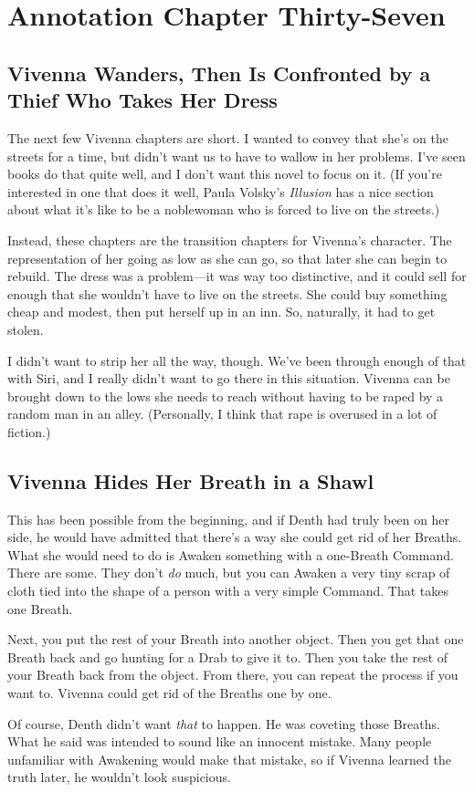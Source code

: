 \section{Annotation Chapter Thirty-Seven}

\subsection*{Vivenna Wanders, Then Is Confronted by a Thief Who Takes Her Dress}

The next few Vivenna chapters are short. I wanted to convey that she’s on the streets for a time, but didn’t want us to have to wallow in her problems. I’ve seen books do that quite well, and I don’t want this novel to focus on it. (If you’re interested in one that does it well, Paula Volsky’s \textit{Illusion} has a nice section about what it’s like to be a noblewoman who is forced to live on the streets.)

Instead, these chapters are the transition chapters for Vivenna’s character. The representation of her going as low as she can go, so that later she can begin to rebuild. The dress was a problem—it was way too distinctive, and it could sell for enough that she wouldn’t have to live on the streets. She could buy something cheap and modest, then put herself up in an inn. So, naturally, it had to get stolen.

I didn’t want to strip her all the way, though. We’ve been through enough of that with Siri, and I really didn’t want to go there in this situation. Vivenna can be brought down to the lows she needs to reach without having to be raped by a random man in an alley. (Personally, I think that rape is overused in a lot of fiction.)

\subsection*{Vivenna Hides Her Breath in a Shawl}

This has been possible from the beginning, and if Denth had truly been on her side, he would have admitted that there’s a way she could get rid of her Breaths. What she would need to do is Awaken something with a one-Breath Command. There are some. They don’t \textit{do} much, but you can Awaken a very tiny scrap of cloth tied into the shape of a person with a very simple Command. That takes one Breath.

Next, you put the rest of your Breath into another object. Then you get that one Breath back and go hunting for a Drab to give it to. Then you take the rest of your Breath back from the object. From there, you can repeat the process if you want to. Vivenna could get rid of the Breaths one by one.

Of course, Denth didn’t want \textit{that} to happen. He was coveting those Breaths. What he said was intended to sound like an innocent mistake. Many people unfamiliar with Awakening would make that mistake, so if Vivenna learned the truth later, he wouldn’t look suspicious.



